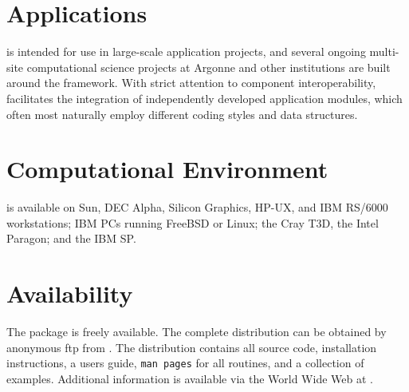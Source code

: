 \section*{Applications}
 is intended for use in large-scale application projects, and
several ongoing multi-site computational science projects at Argonne
and other institutions are built around the  framework.
With strict attention to component interoperability, 
facilitates the integration of independently developed application
modules, which often most naturally employ different coding styles and
data structures. 

\section*{Computational Environment}
 is available on Sun, DEC Alpha, Silicon Graphics, HP-UX, and IBM
RS/6000 workstations; IBM PCs running FreeBSD or Linux; the Cray T3D,
the Intel Paragon; and the IBM SP.

\section*{Availability}

The  package is freely available.
The complete distribution can be obtained by anonymous ftp from 
.
The  distribution contains all source code, installation
instructions, a users guide, {\tt man pages} for all routines, and a
collection of examples.  Additional information is available via the
World Wide Web at
.

\vspace{-.1cm}
\makeinfo

